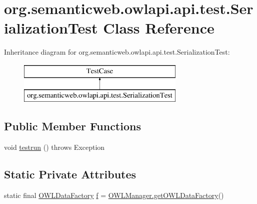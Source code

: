 \hypertarget{classorg_1_1semanticweb_1_1owlapi_1_1api_1_1test_1_1_serialization_test}{\section{org.\-semanticweb.\-owlapi.\-api.\-test.\-Serialization\-Test Class Reference}
\label{classorg_1_1semanticweb_1_1owlapi_1_1api_1_1test_1_1_serialization_test}
}
Inheritance diagram for org.\-semanticweb.\-owlapi.\-api.\-test.\-Serialization\-Test\-:\begin{figure}[H]
\begin{center}
\leavevmode
\includegraphics[height=2.000000cm]{classorg_1_1semanticweb_1_1owlapi_1_1api_1_1test_1_1_serialization_test}
\end{center}
\end{figure}
\subsection*{Public Member Functions}
\begin{DoxyCompactItemize}
\item 
void \hyperlink{classorg_1_1semanticweb_1_1owlapi_1_1api_1_1test_1_1_serialization_test_ace70490f2f48378b38555428cda45dd0}{testrun} ()  throws Exception 
\end{DoxyCompactItemize}
\subsection*{Static Private Attributes}
\begin{DoxyCompactItemize}
\item 
static final \hyperlink{interfaceorg_1_1semanticweb_1_1owlapi_1_1model_1_1_o_w_l_data_factory}{O\-W\-L\-Data\-Factory} \hyperlink{classorg_1_1semanticweb_1_1owlapi_1_1api_1_1test_1_1_serialization_test_a3a7ffecb41fa78087358913358256221}{f} = \hyperlink{classorg_1_1semanticweb_1_1owlapi_1_1apibinding_1_1_o_w_l_manager_aa1c4536a1e6ec54da82c88dc0e58e962}{O\-W\-L\-Manager.\-get\-O\-W\-L\-Data\-Factory}()
\end{DoxyCompactItemize}



